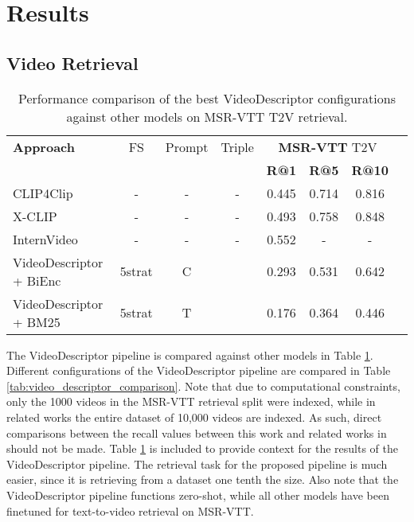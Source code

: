 \section{Results}

\subsection{Video Retrieval}

\begin{table}[htbp]
  \centering
  \begin{tabular}{lccccccc}
    \toprule
    \textbf{Approach} &FS & Prompt & Triple & \multicolumn{3}{c}{\textbf{MSR-VTT} T2V} \\
    \cmidrule(lr){5-7}
                      &&&& \textbf{R@1} & \textbf{R@5} & \textbf{R@10} \\
    \midrule
    CLIP4Clip \cite{clip4clip} &-&-&-& 0.445 & 0.714 &  0.816\\
    \midrule
    X-CLIP \cite{xclip} &-&-&-& 0.493 & 0.758 & 0.848 \\
    \midrule
    InternVideo \cite{internvideo} &-&-&-& 0.552 & - & - \\
    \bottomrule
    VideoDescriptor + BiEnc &5strat&C& & 0.293 & 0.531 & 0.642 \\
    \midrule
    VideoDescriptor + BM25 &5strat&T& & 0.176 & 0.364 & 0.446 \\
  \end{tabular}
  \caption{Performance comparison of the best VideoDescriptor configurations against other models on MSR-VTT T2V retrieval.}
  \label{tab:model_comparison}
\end{table}

The VideoDescriptor pipeline is compared against other models in Table \ref{tab:model_comparison}.
Different configurations of the VideoDescriptor pipeline are compared in Table \ref{tab:video_descriptor_comparison}. %
Note that due to computational constraints, only the 1000 videos in the MSR-VTT retrieval split were indexed, while in related works the entire dataset of 10,000 videos are indexed.
As such, direct comparisons between the recall values between this work and related works in should not be made.
Table \ref{tab:model_comparison} is included to provide context for the results of the VideoDescriptor pipeline.
The retrieval task for the proposed pipeline is much easier, since it is retrieving from a dataset one tenth the size.
Also note that the VideoDescriptor pipeline functions zero-shot, while all other models have been finetuned for text-to-video retrieval on MSR-VTT.


